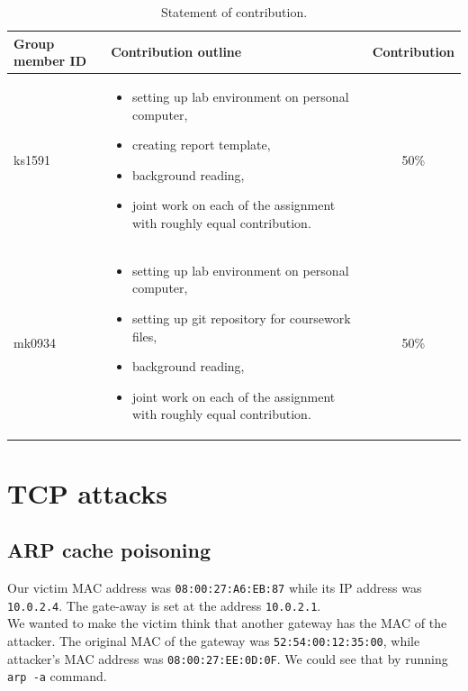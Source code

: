 \documentclass[12pt, a4paper]{article}
\begin{document}
\begin{center}
  \begin{table}[h]
    \begin{tabular}{ l | p{8.5cm} | c }
      Group member ID & Contribution outline & Contribution \\
      \hline
      ks1591 &
      \begin{itemize}
        \item setting up lab environment on personal computer,
        \item creating report template,
        \item background reading,
        \item joint work on each of the assignment with roughly equal contribution.
      \end{itemize}
      & 50\% \\
      mk0934 &
      \begin{itemize}
        \item setting up lab environment on personal computer,
        \item setting up git repository for coursework files,
        \item background reading,
        \item joint work on each of the assignment with roughly equal contribution.
      \end{itemize}
      & 50\% \\
    \end{tabular}
    \caption{Statement of contribution.\label{tab:SoC}}
  \end{table}
\end{center}

\newpage

\section{TCP attacks}

\subsection{ARP cache poisoning}\label{arp}

Our victim MAC address was \texttt{08:00:27:A6:EB:87} while its IP address was \texttt{10.0.2.4}. The gate-away is set at the address \texttt{10.0.2.1}.\\

We wanted to make the victim think that another gateway has the MAC of the attacker. The original MAC of the gateway was \texttt{52:54:00:12:35:00}, while attacker's MAC address was \texttt{08:00:27:EE:0D:0F}. We could see that by running \texttt{arp -a} command.\\
\end{document}
